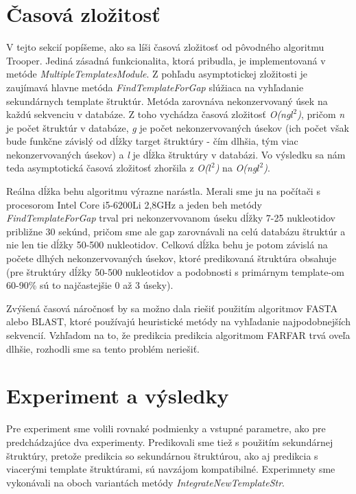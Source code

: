 \section{Časová zložitosť} 
V tejto sekcií popíšeme, ako sa líši časová zložitosť od pôvodného algoritmu Trooper. Jediná zásadná funkcionalita, ktorá pribudla, je implementovaná v metóde \textit{MultipleTemplatesModule}.
Z pohľadu asymptotickej zložitosti je zaujímavá hlavne metóda  \textit{FindTemplateForGap} slúžiaca na vyhľadanie sekundárnych template štruktúr. Metóda zarovnáva nekonzervovaný úsek na každú sekvenciu v databáze. Z toho vychádza časová zložitosť \textit{O(ng$l^2$)}, pričom \textit{n} je počet štruktúr v databáze, \textit{g} je počet nekonzervovaných úsekov (ich počet však bude funkčne závislý od dĺžky target štruktúry - čím dlhšia, tým viac nekonzervovaných úsekov)  a \textit{l} je dĺžka štruktúry v databázi. Vo výsledku sa nám teda asymptotická časová zložitosť zhoršila z \textit{O($l^2$)} na \textit{O(ng$l^2$)}.


\indent Reálna dĺžka behu algoritmu výrazne narástla. Merali sme ju na počítači s procesorom Intel Core i5-6200Li 2,8GHz a jeden beh metódy \textit{FindTemplateForGap} trval pri nekonzervovanom úseku dĺžky 7-25 nukleotidov približne 30 sekúnd, pričom sme ale gap zarovnávali na celú databázu štruktúr a nie len tie dĺžky 50-500 nukleotidov. Celková dĺžka behu je potom závislá na počete dlhých nekonzervovaných úsekov, ktoré predikovaná štruktúra obsahuje (pre štruktúry dĺžky 50-500 nukleotidov a podobnosti s primárnym template-om 60-90\% sú to  najčastejšie 0 až 3 úseky). 


\indent Zvýšená časová náročnosť by sa možno dala riešiť použitím algoritmov FASTA alebo BLAST, ktoré používajú heuristické metódy na vyhľadanie najpodobnejších sekvencií. Vzhľadom na to, že predikcia predikcia algoritmom FARFAR trvá oveľa dlhšie, rozhodli sme sa tento problém neriešiť.


\section{Experiment a výsledky} 
Pre experiment sme volili rovnaké podmienky a vstupné parametre, ako pre predchádzajúce dva experimenty. Predikovali sme tiež s použitím sekundárnej štruktúry, pretože predikcia so sekundárnou štruktúrou, ako aj predikcia s viacerými template štruktúrami, sú navzájom kompatibilné. Experimnety sme vykonávali na oboch variantách metódy \textit{IntegrateNewTemplateStr}.


